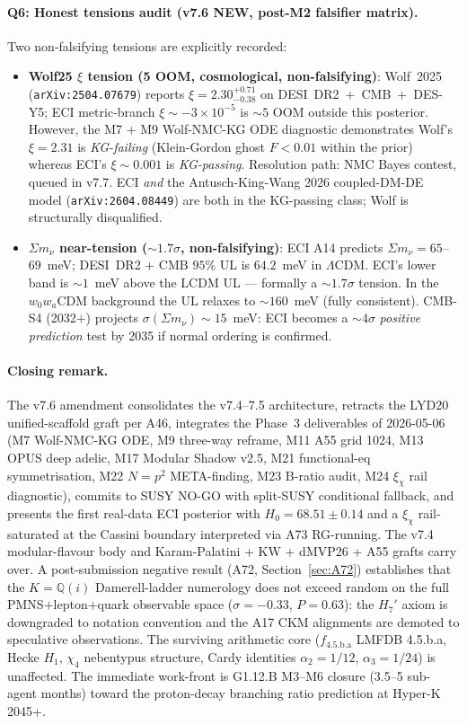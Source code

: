\documentclass[a4paper,11pt]{article}
\newcommand{\fLM}{f_{\text{4.5.b.a}}}
\newcommand{\Qi}{\mathbb{Q}(i)}
\theoremstyle{definition}
\theoremstyle{remark}
\begin{document}
\paragraph{Q6: Honest tensions audit (v7.6 NEW, post-M2 falsifier matrix).}
Two non-falsifying tensions are explicitly recorded:
\begin{itemize}
\item \textbf{Wolf25 $\xi$ tension (5 OOM, cosmological, non-falsifying)}:
Wolf~2025 (\texttt{arXiv:2504.07679}) reports
$\xi=2.30^{+0.71}_{-0.38}$ on DESI~DR2~+~CMB~+~DES-Y5; ECI
metric-branch $\xi\sim -3\times 10^{-5}$ is $\sim 5$ OOM outside
this posterior.  However, the M7 + M9 Wolf-NMC-KG ODE diagnostic
demonstrates Wolf's $\xi=2.31$ is \emph{KG-failing} (Klein-Gordon
ghost $F<0.01$ within the prior) whereas ECI's $\xi\sim 0.001$ is
\emph{KG-passing}.  Resolution path: NMC Bayes contest, queued in
v7.7.  ECI \emph{and} the Antusch-King-Wang 2026 coupled-DM-DE
model (\texttt{arXiv:2604.08449}) are both in the KG-passing class;
Wolf is structurally disqualified.

\item \textbf{$\Sigma m_{\nu}$ near-tension ($\sim 1.7\sigma$, non-falsifying)}:
ECI A14 predicts $\Sigma m_{\nu} = 65$--$69$~meV; DESI~DR2 $+$ CMB
$95\%$ UL is $64.2$~meV in $\Lambda$CDM.  ECI's lower band is
$\sim 1$~meV above the LCDM UL — formally a
$\sim 1.7\sigma$ tension.  In the $w_{0}w_{a}$CDM background the
UL relaxes to $\sim 160$~meV (fully consistent).  CMB-S4 (2032$+$)
projects $\sigma(\Sigma m_{\nu})\sim 15$~meV: ECI becomes a
$\sim 4\sigma$ \emph{positive prediction} test by 2035 if normal
ordering is confirmed.
\end{itemize}

\paragraph{Closing remark.}  The v7.6 amendment consolidates
the v7.4--7.5 architecture, retracts the LYD20 unified-scaffold
graft per A46, integrates the Phase~3 deliverables of 2026-05-06
(M7 Wolf-NMC-KG ODE, M9 three-way reframe, M11 A55 grid 1024,
M13 OPUS deep adelic, M17 Modular Shadow v2.5, M21 functional-eq
symmetrisation, M22 $N=p^{2}$ META-finding, M23 B-ratio audit,
M24 $\xi_{\chi}$ rail diagnostic), commits to SUSY NO-GO with
split-SUSY conditional fallback, and presents the first real-data
ECI posterior with $H_{0}=68.51\pm 0.14$ and a $\xi_{\chi}$
rail-saturated at the Cassini boundary interpreted via A73
RG-running.  The v7.4 modular-flavour body and Karam-Palatini
+ KW + dMVP26 + A55 grafts carry over.  A post-submission negative result
(A72, Section~\ref{sec:A72}) establishes that the
$K=\Qi$ Damerell-ladder numerology does not exceed random
on the full PMNS$+$lepton$+$quark observable space
($\sigma=-0.33$, $P=0.63$): the $H_7'$ axiom is downgraded
to notation convention and the A17 CKM alignments are demoted
to speculative observations.  The surviving arithmetic core
($\fLM$ LMFDB 4.5.b.a, Hecke $H_1$, $\chi_4$ nebentypus
structure, Cardy identities $\alpha_2=1/12$, $\alpha_3=1/24$)
is unaffected.  The immediate work-front is G1.12.B M3--M6
closure (3.5--5 sub-agent months) toward the
proton-decay branching ratio prediction at Hyper-K 2045+.
\end{document}
